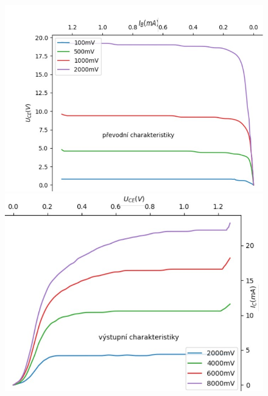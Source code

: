 \documentclass[a4paper]{article}
\begin{document}
\begin{figure}[H]
	\centering
\begin{minipage}[b]{0.49\textwidth}
	\includegraphics[width=\textwidth]{2.jpg}
\end{minipage}
\begin{minipage}[b]{0.435\textwidth}
	\includegraphics[width=\textwidth]{3_2.jpg}
\end{minipage}
\\
	\centering
	\hspace*{.99cm}
	\begin{minipage}[b]{0.48\textwidth}

\end{minipage}
\end{figure}
\end{document}
